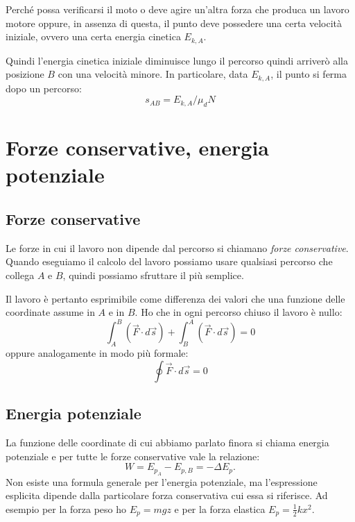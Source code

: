 \documentclass[class=book, crop=false, oneside, 12pt]{standalone}
\begin{document}
Perché possa verificarsi il moto o deve agire un'altra forza che produca un lavoro motore oppure, in assenza di questa, il punto deve possedere una certa velocità iniziale, ovvero una certa energia cinetica \(E_{k,A}\).

Quindi l'energia cinetica iniziale diminuisce lungo il percorso quindi arriverò alla posizione \(B\) con una velocità minore.\newline
In particolare, data \(E_{k,A}\), il punto si ferma dopo un percorso:
\begin{equation*}
    s_{AB} = E_{k,A} / \mu_d N
\end{equation*} 

\section{Forze conservative, energia potenziale}

\subsection{Forze conservative}

Le forze in cui il lavoro non dipende dal percorso si chiamano \emph{forze conservative}.
Quando eseguiamo il calcolo del lavoro possiamo usare qualsiasi percorso che collega \(A\) e \(B\), quindi possiamo sfruttare il più semplice.

Il lavoro è pertanto esprimibile come differenza dei valori che una funzione delle coordinate assume in \(A\) e in \(B\).
Ho che in ogni percorso chiuso il lavoro è nullo:
\begin{equation}
    \int_A^B (\overrightarrow{F} \cdot d \overrightarrow{s}) + \int_B^A (\overrightarrow{F} \cdot d \overrightarrow{s}) = 0
\end{equation}
oppure analogamente in modo più formale:
\begin{equation}
    \oint \overrightarrow{F} \cdot d \overrightarrow{s} = 0
\end{equation}

\subsection{Energia potenziale}

La funzione delle coordinate di cui abbiamo parlato finora si chiama energia potenziale e per tutte le forze conservative vale la relazione:
\begin{equation}
    W = E_{p_A} - E_{p,B} = - \Delta E_p .
\end{equation}
Non esiste una formula generale per l'energia potenziale, ma l'espressione esplicita dipende dalla particolare forza conservativa cui essa si riferisce.
Ad esempio per la forza peso ho \(E_p = mgz\) e per la forza elastica \(E_p = \frac{1}{2} k x^2\).
\end{document}
